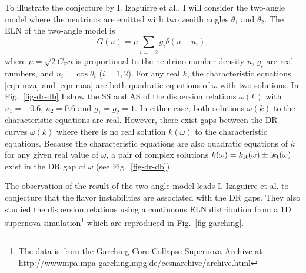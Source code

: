 



To illustrate the conjecture by I. Izaguirre et al., I will consider the two-angle model where the neutrinos are emitted with two zenith angles $\theta_1$ and $\theta_2$. The ELN of the two-angle model is
\begin{equation}
G(u)= \mu \sum_{i=1,2} g_i \delta(u - u_i),
\end{equation}
where $\mu = \sqrt{2}G_{\mathrm F} n$ is proportional to the neutrino number density $n$, $g_i$ are real numbers, and $u_i=\cos \theta_i$ ($i=1,2$). For any real $k$, the characteristic equations \eqref{eqn-mza} and \eqref{eqn-maa} are both quadratic equations of $\omega$ with two solutions.
In Fig.~\ref{fig-dr-db} I show the SS and AS of the dispersion relations $\omega(k)$ with $u_1=-0.6$, $u_2=0.6$ and $g_1=g_2=1$. In either case, both solutions $\omega(k)$ to the characteristic equations are real. However, there exist gaps between the DR curves $\omega(k)$ where there is no real solution $k(\omega)$ to the characteristic equations. Because the characteristic equations are also quadratic equations of $k$ for any given real value of $\omega$, a pair of complex solutions $k (\omega) = k_{\mathrm R} (\omega) \pm \mathrm{i} k_{\mathrm I}(\omega)$ exist in the DR gap of $\omega$ (see Fig.~\ref{fig-dr-db}).

The observation of the result of the two-angle model leads I. Izaguirre et al. to conjecture that the flavor instabilities are associated with the DR gaps. They also studied the dispersion relations using a continuous ELN distribution from a 1D supernova simulation\footnote{The data is from the Garching Core-Collapse Supernova Archive at \url{http://wwwmpa.mpa-garching.mpg.de/ccsnarchive/archive.html} } which are reproduced in Fig.~\ref{fig-garching}.

